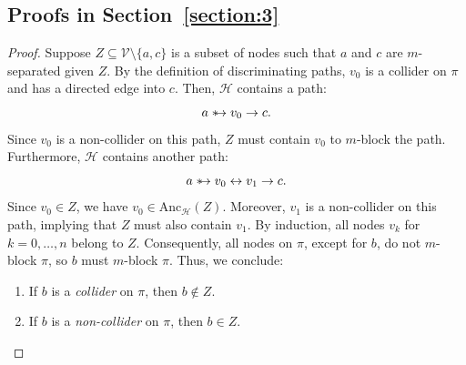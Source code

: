 \documentclass[accepted]{uai2025} %
\newcommand{\anc}{\text{Anc}}
\newcommand{\tuh}{\mathrel{\rightarrow}}
\newcommand{\huh}{\mathrel{\leftrightarrow}}
\newcommand{\suh}{\mathrel{{\ast\mkern-11mu\to}}}
\begin{document}
\subsection{Proofs in Section~\ref{section:3}}
\lemmasix*
\begin{proof}
Suppose $Z\subseteq\mathcal{V}\setminus\{a,c\}$ is a subset of nodes such that $a$ and $c$ are $m$-separated given $Z$. By the definition of discriminating paths, $v_0$ is a collider on $\pi$ and has a directed edge into $c$. Then, ${\mathcal{H}}$ contains a path:
\[
a \suh v_0 \tuh c.
\]
Since $v_0$ is a non-collider on this path, $Z$ must contain $v_0$ to $m$-block the path. Furthermore, ${\mathcal{H}}$ contains another path:
\[
a \suh v_0 \huh v_1 \tuh c.
\]
Since $v_0 \in Z$, we have $v_0 \in \anc_{\mathcal{H}}(Z)$. Moreover, $v_1$ is a non-collider on this path, implying that $Z$ must also contain $v_1$. By induction, all nodes $v_k$ for $k=0,\dots,n$ belong to $Z$. Consequently, all nodes on $\pi$, except for $b$, do not $m$-block $\pi$, so $b$ must $m$-block $\pi$. Thus, we conclude:
\begin{enumerate}
    \item If $b$ is a \emph{collider} on $\pi$, then $b \notin Z$.
    \item If $b$ is a \emph{non-collider} on $\pi$, then $b \in Z$.
\end{enumerate}
\end{proof}
\end{document}
